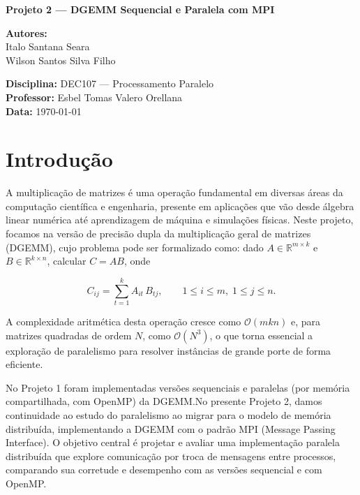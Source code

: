 \documentclass[12pt, a4paper]{article}
\begin{document}
    \begin{titlepage}
        \centering
        \vspace*{2cm}

        {\huge\bfseries Projeto 2 --- DGEMM Sequencial e Paralela com MPI\par}
        \vspace{1.5cm}

        {\Large \textbf{Autores:}\\ Italo Santana Seara\\ Wilson Santos Silva Filho\\ }

        \vspace{2cm}

        {\large \textbf{Disciplina:} DEC107 — Processamento Paralelo\\ \textbf{Professor:} Esbel Tomas Valero Orellana\\ \textbf{Data:} \today\\ }

        \vfill
    \end{titlepage}

    \tableofcontents

    \newpage
    \section{Introdução}\label{sec:introducao}

    A multiplicação de matrizes é uma operação fundamental em diversas áreas da computação científica e engenharia, presente em aplicações que vão desde álgebra linear numérica até aprendizagem de máquina e simulações físicas. Neste projeto, focamos na versão de precisão dupla da multiplicação geral de matrizes (DGEMM), cujo problema pode ser formalizado como: dado $A\in\mathbb{R}^{m\times k}$ e $B\in\mathbb{R}^{k\times n}$, calcular $C=AB$, onde
    
    \[
        C_{ij}=\sum_{t=1}^{k} A_{it}\,B_{tj}, \qquad 1 \le i \le m, \;1 \le j \le n.
    \]

    A complexidade aritmética desta operação cresce como $\mathcal{O}(mkn)$ e, para matrizes quadradas de ordem $N$, como $\mathcal{O}(N^{3})$, o que torna essencial a exploração de paralelismo para resolver instâncias de grande porte de forma eficiente.

    No Projeto 1 foram implementadas versões sequenciais e paralelas (por memória compartilhada, com OpenMP) da DGEMM.\@ No presente Projeto 2, damos continuidade ao estudo do paralelismo ao migrar para o modelo de memória distribuída, implementando a DGEMM com o padrão MPI (Message Passing Interface). O objetivo central é projetar e avaliar uma implementação paralela distribuída que explore comunicação por troca de mensagens entre processos, comparando sua corretude e desempenho com as versões sequencial e com OpenMP.\@
\end{document}
